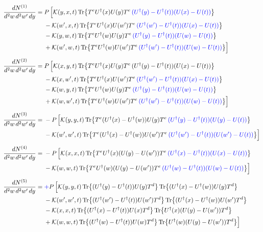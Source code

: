\documentclass[10pt]{article}
\begin{document}
\begin{align}
\frac{dN^{(1)}}{d^2w\,d^2w'\,dy}={}&P\,\Big[
{\cal K}(y,x,t)\,{\rm Tr}\big\{T^eU^\dagger(x)U(y)T^e\,\textcolor{blue}{(U^\dagger(y)-U^\dagger(t))(U(x)-U(t))}\big\}\notag\\
&-{\cal K}(w',x,t)\,{\rm Tr}\big\{T^eU^\dagger(x)U(w')T^e\,\textcolor{blue}{(U^\dagger(w')-U^\dagger(t))(U(x)-U(t))}\big\}\notag\\
&-{\cal K}(y,w,t)\,{\rm Tr}\big\{T^eU^\dagger(w)U(y)T^e\,\textcolor{blue}{(U^\dagger(y)-U^\dagger(t))(U(w)-U(t))}\big\}\notag\\
&+{\cal K}(w',w,t)\,{\rm Tr}\big\{T^eU^\dagger(w)U(w')T^e\,\textcolor{blue}{(U^\dagger(w')-U^\dagger(t))(U(w)-U(t))}\big\}\Big]\\[4pt]
\frac{dN^{(2)}}{d^2w\,d^2w'\,dy}={}&P\,\Big[
{\cal K}(x,y,t)\,{\rm Tr}\big\{T^eU^\dagger(x)U(y)T^e\,(U^\dagger(y)-U^\dagger(t))(U(x)-U(t))\big\}\notag\\
&-{\cal K}(x,w',t)\,{\rm Tr}\big\{T^eU^\dagger(x)U(w')T^e\,\textcolor{blue}{(U^\dagger(w')-U^\dagger(t))(U(x)-U(t))}\big\}\notag\\
&-{\cal K}(w,y,t)\,{\rm Tr}\big\{T^eU^\dagger(w)U(y)T^e\,\textcolor{blue}{(U^\dagger(y)-U^\dagger(t))(U(w)-U(t))}\big\}\notag\\
&+{\cal K}(w,w',t)\,{\rm Tr}\big\{T^eU^\dagger(w)U(w')T^e\,\textcolor{blue}{(U^\dagger(w')-U^\dagger(t))(U(w)-U(t))}\big\}\Big]\\[4pt]
\frac{dN^{(3)}}{d^2w\,d^2w'\,dy}={}&-P\,\Big[
{\cal K}(y,y,t)\,{\rm Tr}\big\{T^e(U^\dagger(x)-U^\dagger(w))U(y)T^e\,\textcolor{blue}{(U^\dagger(y)-U^\dagger(t))(U(y)-U(t))}\big\}\notag\\
&-{\cal K}(w',w',t)\,{\rm Tr}\big\{T^e(U^\dagger(x)-U^\dagger(w))U(w')T^e\,\textcolor{blue}{(U^\dagger(w')-U^\dagger(t))(U(w')-U(t))}\big\}\Big]\\[4pt]
\frac{dN^{(4)}}{d^2w\,d^2w'\,dy}={}&-P\,\Big[
{\cal K}(x,x,t)\,{\rm Tr}\big\{T^eU^\dagger(x)(U(y)-U(w'))T^e\,\textcolor{blue}{(U^\dagger(x)-U^\dagger(t))(U(x)-U(t))}\big\}\notag\\
&-{\cal K}(w,w,t)\,{\rm Tr}\big\{T^eU^\dagger(w)(U(y)-U(w'))T^e\,\textcolor{blue}{(U^\dagger(w)-U^\dagger(t))(U(w)-U(t))}\big\}\Big]\\[4pt]
\frac{dN^{(5)}}{d^2w\,d^2w'\,dy}={}&\textcolor{blue}{+}P\,\Big[
{\cal K}(y,y,t)\,{\rm Tr}\big\{(U^\dagger(y)-U^\dagger(t))U(y)T^d\big\}\,{\rm Tr}\big\{(U^\dagger(x)-U^\dagger(w))U(y)T^d\big\}\notag\\
&-{\cal K}(w',w',t)\,{\rm Tr}\big\{(U^\dagger(w')-U^\dagger(t))U(w')T^d\big\}\,{\rm Tr}\big\{(U^\dagger(x)-U^\dagger(w))U(w')T^d\big\}\notag\\
&-{\cal K}(x,x,t)\,{\rm Tr}\big\{(U^\dagger(x)-U^\dagger(t))U(x)T^d\big\}\,{\rm Tr}\big\{U^\dagger(x)(U(y)-U(w'))T^d\big\}\notag\\
&+{\cal K}(w,w,t)\,{\rm Tr}\big\{(U^\dagger(w)-U^\dagger(t))U(w)T^d\big\}\,{\rm Tr}\big\{U^\dagger(w)(U(y)-U(w'))T^d\big\}\Big]
\end{align}
\end{document}
